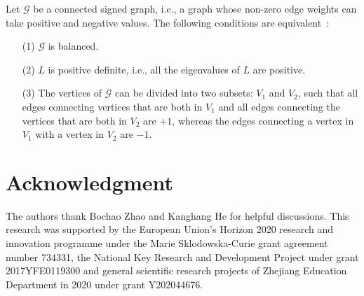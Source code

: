 \documentclass[journal]{IEEEtran}
\begin{document}
\begin{Lem}\label{Lem:balance_graph_condition}
	Let $\mathcal{G}$ be a connected signed graph, i.e., a graph whose non-zero edge weights can take positive and negative values. 
	The following conditions are equivalent~\cite{zaslavsky1982signed,hou2003laplacian,Dittrich20200signedgraph}:
	\begin{itemize}
		\item [(1)] $\mathcal{G}$ is balanced. 
		\item [(2)] $L$ is positive definite, i.e., all the eigenvalues of $L$ are positive.
		\item [(3)] The vertices of $\mathcal{G}$ can be divided into two subsets: $V_1$ and $V_2$, such that all edges connecting vertices that are both in $V_1$ and all edges connecting the vertices that are both in $V_2$ are $+1$, whereas the edges connecting a vertex in $V_1$ with a vertex in $V_2$ are $-1$.
	\end{itemize}
\end{Lem}


\section*{Acknowledgment}
The authors thank Bochao Zhao and Kanghang He for helpful discussions.
This research was supported by the European Union's Horizon 2020 research and innovation programme under the Marie Sklodowska-Curie grant agreement  number 734331, the National Key Research and Development Project under grant 2017YFE0119300 and general scientific research projects of Zhejiang Education Department in 2020 under grant Y202044676.

\ifCLASSOPTIONcaptionsoff
  \newpage
\fi




\end{document}

